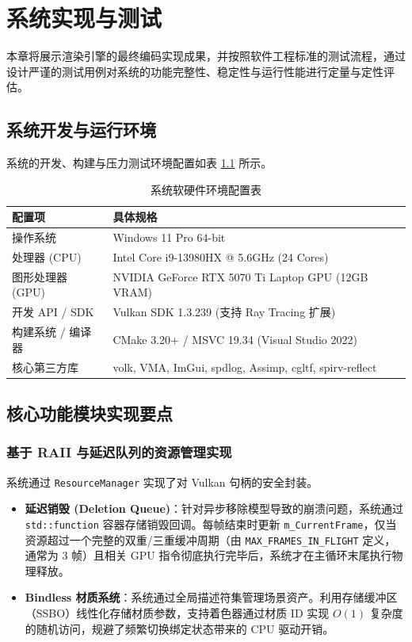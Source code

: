 
\chapter{系统实现与测试}
\label{chap:implementation}

本章将展示渲染引擎的最终编码实现成果，并按照软件工程标准的测试流程，通过设计严谨的测试用例对系统的功能完整性、稳定性与运行性能进行定量与定性评估。

\section{系统开发与运行环境}
系统的开发、构建与压力测试环境配置如表 \ref{tab:environment} 所示。

\begin{table}[H]
\centering
\caption{系统软硬件环境配置表}
\label{tab:environment}
\begin{tabular}{|l|l|}
\hline
\textbf{配置项} & \textbf{具体规格} \\ \hline
操作系统 & Windows 11 Pro 64-bit \\ \hline
处理器 (CPU) & Intel Core i9-13980HX @ 5.6GHz (24 Cores) \\ \hline
图形处理器 (GPU) & NVIDIA GeForce RTX 5070 Ti Laptop GPU (12GB VRAM) \\ \hline
开发 API / SDK & Vulkan SDK 1.3.239 (支持 Ray Tracing 扩展) \\ \hline
构建系统 / 编译器 & CMake 3.20+ / MSVC 19.34 (Visual Studio 2022) \\ \hline
核心第三方库 & volk, VMA, ImGui, spdlog, Assimp, cgltf, spirv-reflect \\ \hline
\end{tabular}
\end{table}

\section{核心功能模块实现要点}

\subsection{基于 RAII 与延迟队列的资源管理实现}
系统通过 \texttt{ResourceManager} 实现了对 Vulkan 句柄的安全封装。
\begin{itemize}
    \item \textbf{延迟销毁 (Deletion Queue)}：针对异步移除模型导致的崩溃问题，系统通过 \texttt{std::function} 容器存储销毁回调。每帧结束时更新 \texttt{m\_CurrentFrame}，仅当资源超过一个完整的双重/三重缓冲周期（由 \texttt{MAX\_FRAMES\_IN\_FLIGHT} 定义，通常为 3 帧）且相关 GPU 指令彻底执行完毕后，系统才在主循环末尾执行物理释放。
    \item \textbf{Bindless 材质系统}：系统通过全局描述符集管理场景资产。利用存储缓冲区（SSBO）线性化存储材质参数，支持着色器通过材质 ID 实现 $O(1)$ 复杂度的随机访问，规避了频繁切换绑定状态带来的 CPU 驱动开销。
\end{itemize}

